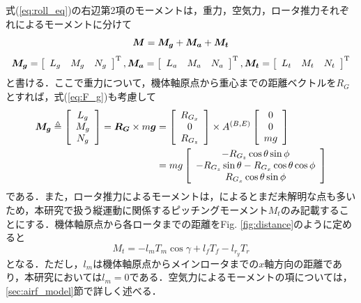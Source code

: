 式(\ref{eq:roll_eq})の右辺第2項のモーメントは，重力，空気力，ロータ推力それぞれによるモーメントに分けて
\begin{equation}
    \mbox{\boldmath $M$} = \mbox{\boldmath $M_g$} + \mbox{\boldmath $M_a$} + \mbox{\boldmath $M_t$}
\end{equation}
\begin{align*}
  \mbox{\boldmath $M_g$} =
  \left[
  \begin{array}{c}
    L_g \quad M_g \quad N_g
  \end{array}
  \right]^{\mathrm{T}},
  \mbox{\boldmath $M_a$} =
  \left[
  \begin{array}{c}
    L_a \quad M_a \quad N_a
  \end{array}
  \right]^{\mathrm{T}},
  \mbox{\boldmath $M_t$} =
  \left[
  \begin{array}{c}
    L_t \quad M_t \quad N_t
  \end{array}
  \right]^{\mathrm{T}}
\end{align*}
と書ける．ここで重力について，機体軸原点から重心までの距離ベクトルを\mbox{\boldmath $R_G$}とすれば，式(\ref{eq:F_g})も考慮して
\begin{equation}
  \begin{split}
    \mbox{\boldmath $M_g$} \triangleq
    \left[
    \begin{array}{ccc}
      L_g \\
      M_g \\
      N_g
    \end{array}
    \right] =
    \mbox{\boldmath $R_G$} \times
    m\mbox{\boldmath $g$} &=
    \left[
    \begin{array}{ccc}
      R_{G_x} \\
      0 \\
      R_{G_z}
    \end{array}
    \right] \times A^{(B,E)}
		  \left[
		  \begin{array}{ccc}
		    0 \\
		    0 \\
		    mg
		  \end{array}
    \right] \\
    &= mg
    \left[
    \begin{array}{ccc}
      -R_{G_z}\cos\theta\sin\phi \\
      -R_{G_z}\sin\theta - R_{G_x}\cos\theta\cos\phi \\
      R_{G_x}\cos\theta\sin\phi
    \end{array}
    \right]
  \end{split}
  \label{eq:M_g}
\end{equation}
である．また，ロータ推力によるモーメントは，\cite{yoshimura}によるとまだ未解明な点も多いため，本研究で扱う縦運動に関係するピッチングモーメント$M_t$のみ記載することにする．機体軸原点から各ロータまでの距離をFig. \ref{fig:distance}のように定めると
\begin{equation}
  M_t = -l_m T_m \cos\gamma + l_f T_f - l_{r_y} T_r
  \label{eq:M_t}
\end{equation}
となる．ただし，$l_m$は機体軸原点からメインロータまでの$x$軸方向の距離であり，本研究においては$l_m=0$である．空気力によるモーメントの項については，\ref{sec:airf_model}節で詳しく述べる．


